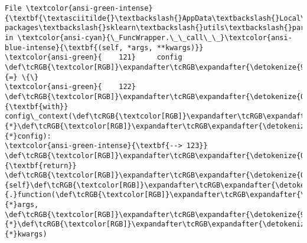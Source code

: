 \documentclass[11pt]{article}
\begin{document}
\begin{Verbatim}[commandchars=\\\{\}, frame=single, framerule=2mm, rulecolor=\color{outerrorbackground}]
File \textcolor{ansi-green-intense}{\textbf{\textasciitilde{}\textbackslash{}AppData\textbackslash{}Local\textbackslash{}anaconda3\textbackslash{}lib\textbackslash{}site-packages\textbackslash{}sklearn\textbackslash{}utils\textbackslash{}parallel.py:123}}, in \textcolor{ansi-cyan}{\_FuncWrapper.\_\_call\_\_}\textcolor{ansi-blue-intense}{\textbf{(self, *args, **kwargs)}}
\textcolor{ansi-green}{    121}     config \def\tcRGB{\textcolor[RGB]}\expandafter\tcRGB\expandafter{\detokenize{98,98,98}}{=} \{\}
\textcolor{ansi-green}{    122} \def\tcRGB{\textcolor[RGB]}\expandafter\tcRGB\expandafter{\detokenize{0,135,0}}{\textbf{with}} config\_context(\def\tcRGB{\textcolor[RGB]}\expandafter\tcRGB\expandafter{\detokenize{98,98,98}}{*}\def\tcRGB{\textcolor[RGB]}\expandafter\tcRGB\expandafter{\detokenize{98,98,98}}{*}config):
\textcolor{ansi-green-intense}{\textbf{--> 123}}     \def\tcRGB{\textcolor[RGB]}\expandafter\tcRGB\expandafter{\detokenize{0,135,0}}{\textbf{return}} \def\tcRGB{\textcolor[RGB]}\expandafter\tcRGB\expandafter{\detokenize{0,135,0}}{self}\def\tcRGB{\textcolor[RGB]}\expandafter\tcRGB\expandafter{\detokenize{98,98,98}}{.}function(\def\tcRGB{\textcolor[RGB]}\expandafter\tcRGB\expandafter{\detokenize{98,98,98}}{*}args, \def\tcRGB{\textcolor[RGB]}\expandafter\tcRGB\expandafter{\detokenize{98,98,98}}{*}\def\tcRGB{\textcolor[RGB]}\expandafter\tcRGB\expandafter{\detokenize{98,98,98}}{*}kwargs)


\end{Verbatim}
\end{document}
